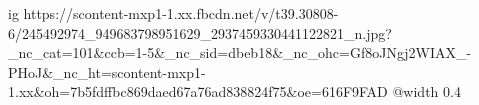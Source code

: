  
 
 
 
 

\ifcmt
  ig https://scontent-mxp1-1.xx.fbcdn.net/v/t39.30808-6/245492974_949683798951629_2937459330441122821_n.jpg?_nc_cat=101&ccb=1-5&_nc_sid=dbeb18&_nc_ohc=Gf8oJNgj2WIAX_-PHoJ&_nc_ht=scontent-mxp1-1.xx&oh=7b5fdffbc869daed67a76ad838824f75&oe=616F9FAD
  @width 0.4
\fi
